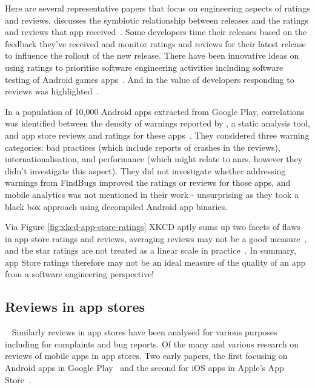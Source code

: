 Here are several representative papers that focus on engineering aspects of ratings and reviews.  \citeauthor{alsubaihin2019app_store_effects_on_software_engineering} discusses the symbiotic relationship between releases and the ratings and reviews that app received~. Some developers time their releases based on the feedback they've received and monitor ratings and reviews for their latest release to influence the rollout of the new release. There have been innovative ideas on using ratings to prioritise software engineering activities including software testing of Android games apps~. And in \citeauthor{greenheld2018_automating_developers_responses_to_app_reviews} the value of developers responding to reviews was highlighted~. 

In a population of 10,000 Android apps extracted from Google Play, correlations was identified between the density of warnings reported by , a static analysis tool, and app store reviews and ratings for these apps~. They considered three warning categories: bad practices (which include reports of crashes in the reviews), internationalisation, and performance (which might relate to \Glspl{anr}, however they didn't investigate this aspect). They did not investigate whether addressing warnings from FindBugs improved the ratings or reviews for those apps, and mobile analytics was not mentioned in their work - unsurprising as they took a black box approach using decompiled Android app binaries.

Via Figure \ref{fig:xkcd-app-store-ratings} XKCD aptly sums up two facets of flaws in app store ratings and reviews, averaging reviews may not be a good measure~, and the star ratings are not treated as a linear scale in practice~. In summary, app Store ratings therefore may not be an ideal measure of the quality of an app from a software engineering perspective! 

\FloatBarrier

\subsection{Reviews in app stores}~\label{rw-reviews-in-app-stores}
Similarly reviews in app stores have been analysed for various purposes including for complaints and bug reports. Of the many and various research on reviews of mobile apps in app stores. 
Two early papers, the first focusing on Android apps in Google Play~\textcite{fu2013_why_people_hate_your_app_making_sense_of_user_feedback_in_a_mobile_app_store} and the second for iOS apps in Apple's App Store~\textcite{khalid2015_what_do_mobile_app_users_complain_about}.

